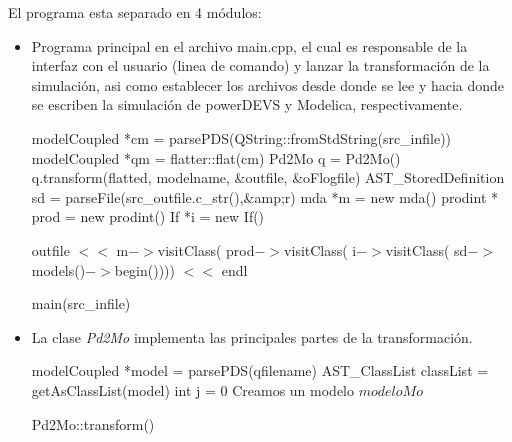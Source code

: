 \documentclass[a4paper,	11pt]{report}
\begin{document}
El programa esta separado en 4 módulos:
\begin{itemize}
\item Programa principal en el archivo main.cpp, el cual es responsable de la interfaz con el usuario (linea de comando) y lanzar la transformación de la simulación, asi como establecer los archivos desde donde se lee y hacia donde se escriben la simulación de powerDEVS y Modelica, respectivamente.


\begin{function*}[H]
 modelCoupled *cm = parsePDS(QString::fromStdString(src\_infile))\;
 modelCoupled *qm = flatter::flat(cm)\;
 Pd2Mo q = Pd2Mo()\;
 q.transform(flatted, modelname, \&outfile, \&oFlogfile)\;
 AST\_StoredDefinition sd = parseFile(src\_outfile.c\_str(),\&amp;r)\;
 mda *m = new mda()\;
 prodint *  prod = new prodint()\;
 If *i = new If()\;
 
 outfile $<<$ m$->$visitClass( 
 	prod$->$visitClass( 
 		i$->$visitClass( 
 		\*sd$->$models()$->$begin()))) $<<$ endl\;
 \caption{main(src\_infile)}
\end{function*}

\newpage
\item La clase \emph{Pd2Mo} implementa las principales partes de la transformación.

\begin{function}[H]
 modelCoupled *model = parsePDS(qfilename)\;
 AST\_ClassList classList = getAsClassList(model)\; 
 int j = 0\;
 Creamos un modelo $modeloMo$\;
 

 \caption{Pd2Mo::transform()}
\end{function}


\end{itemize}
\end{document}
